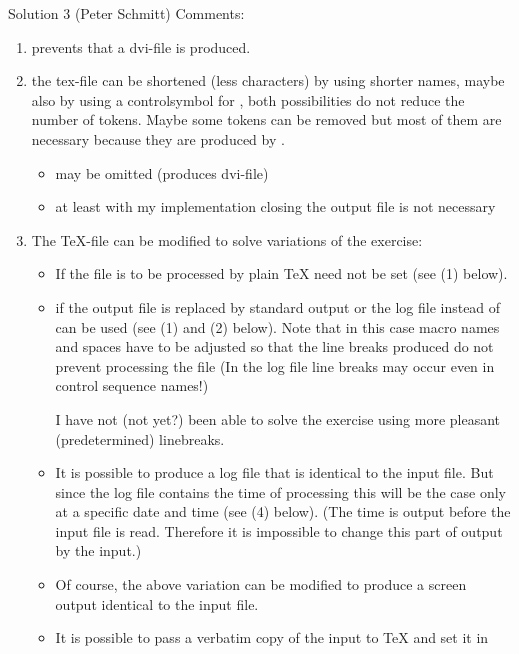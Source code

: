 \begin{solution}{Solution 3 (Peter Schmitt)}
Comments:
\begin{enumerate}
\item \cmd{\immediate} prevents that a dvi-file is produced.
\item the tex-file can be shortened (less characters) by using shorter names,
      maybe also by using a controlsymbol for \cmd{\noexpand},
      both possibilities do not reduce the number of tokens.
      Maybe some \cmd{\space} tokens can be removed but most of them are necessary
      because they are produced by \cmd{\meaning}.
\begin{itemize}
  \item \cmd{\immediate} may be omitted (produces dvi-file)
  \item at least with my implementation closing the output file is not
        necessary
\end{itemize}
\item The TeX-file can be modified to solve variations of the exercise:
  \begin{itemize}
  \item If the file is to be processed by plain TeX \cmd{\catcodes} need not be set
        (see (1) below).
  \item if the output file is replaced by standard output or the log file
        \cmd{\message} instead of \cmd{\write} can be used (see (1) and (2) below).
        Note that in this case macro names and spaces have to be adjusted
        so that the line breaks produced do not prevent processing
        the file (In the log file line breaks may occur even in control
        sequence names!)

        I have not (not yet?) been able to solve the exercise using more
        pleasant (predetermined) linebreaks.
  \item It is possible to produce a log file that is identical to the
        input file. But since the log file contains the time of processing
        this will be the case only at a specific date and time (see (4) below).
        (The time is output before the input file is read. Therefore it is
        impossible to change this part of output by the input.)
  \item Of course, the above variation can be modified to produce a screen
        output identical to the input file.
   \item It is possible to pass a verbatim copy of the input to TeX and set
        it in \cmd{\tt}
  \end{itemize}
\end{enumerate}


\end{solution}
